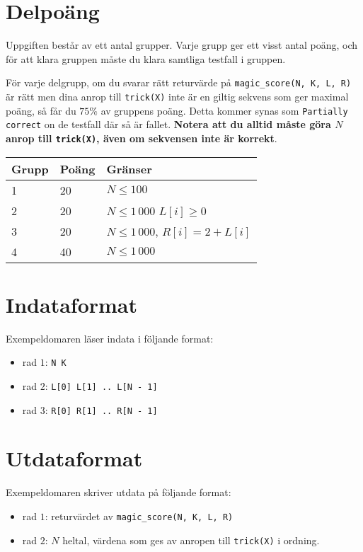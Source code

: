 \section*{Delpoäng}
Uppgiften består av ett antal grupper. Varje grupp ger ett visst antal poäng, och för att klara
gruppen måste du klara samtliga testfall i gruppen.

För varje delgrupp, om du svarar rätt returvärde på \texttt{magic\_score(N, K, L, R)} är rätt men dina anrop till \texttt{trick(X)}
inte är en giltig sekvens som ger maximal poäng, så får du $75\%$ av gruppens poäng.
Detta kommer synas som \texttt{Partially correct} on de testfall där så är fallet. \textbf{Notera att du alltid måste göra $N$ anrop till \texttt{trick(X)},
även om sekvensen inte är korrekt}.

\begin{tabular}{|l|l|l|}
  \hline
  \textbf{Grupp} & \textbf{Poäng} & \textbf{Gränser} \\ \hline
  1 & 20 & $N \le 100$ \\ \hline
  2 & 20 & $N \le 1\,000$ $L[i] \ge 0$\\ \hline
  3 & 20 & $N \le 1\,000$, $R[i] = 2 + L[i]$ \\ \hline
  4 & 40 & $N \le 1\,000$ \\ \hline
\end{tabular}

\section*{Indataformat}
Exempeldomaren läser indata i följande format:

\begin{itemize}
  \item rad $1$: \texttt{N K}
  \item rad $2$: \texttt{L[0] L[1] .. L[N - 1]}
  \item rad $3$: \texttt{R[0] R[1] .. R[N - 1]}
\end{itemize}

\section*{Utdataformat}
Exempeldomaren skriver utdata på följande format:

\begin{itemize}
  \item rad $1$: returvärdet av \texttt{magic\_score(N, K, L, R)}
  \item rad $2$: $N$ heltal, värdena som ges av anropen till \texttt{trick(X)} i ordning.
\end{itemize}
